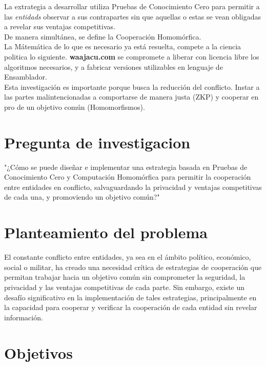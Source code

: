 \documentclass[12pt]{article}
\begin{document}
La extrategia a desarrollar utiliza Pruebas de Conocimiento Cero para 
permitir a las \textit{entidads} observar a sus contrapartes sin que aquellas o estas 
se vean obligadas a revelar sus ventajas competitivas. \\

De manera simultánea, se define la Cooperación Homomórfica. \\

La Mátemática de lo que es necesario ya está resuelta, compete a la ciencia politica lo siguiente. 
\textbf{waajacu.com} se compromete a liberar con licencia libre los algoritmos necesarios, 
y a fabricar versiones utilizables en lenguaje de Ensamblador. \\

Esta investigación es importante porque busca la reducción del conflicto. 
Instar a las partes malintencionadas a comportarse de manera justa (ZKP) 
y cooperar en pro de un objetivo común (Homomorfismos).\\

\section{Pregunta de investigacion}
"¿Cómo se puede diseñar e implementar una estrategia basada en Pruebas de Conocimiento Cero 
y Computación Homomórfica para permitir la cooperación entre entidades en conflicto, 
salvaguardando la privacidad y ventajas competitivas de cada una, y promoviendo un objetivo común?"\\

\section{Planteamiento del problema}
El constante conflicto entre entidades, ya sea en el ámbito político, económico, social o militar, 
ha creado una necesidad crítica de estrategias de cooperación que permitan trabajar hacia un 
objetivo común sin comprometer la seguridad, la privacidad y las ventajas competitivas de cada parte. 
Sin embargo, existe un desafío significativo en la implementación de tales estrategias, principalmente 
en la capacidad para cooperar y verificar la cooperación de cada entidad sin revelar información.\\

\section{Objetivos}
\end{document}
